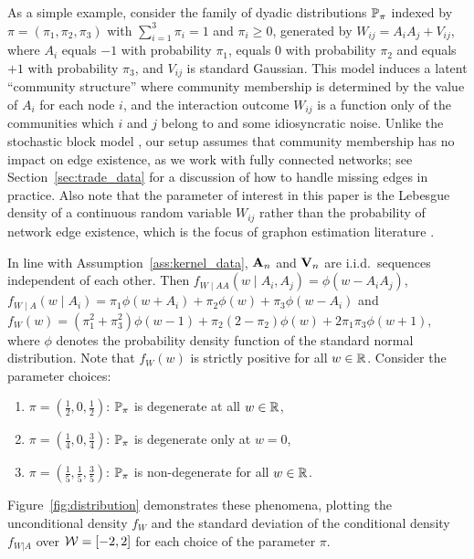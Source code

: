 As a simple example,
consider the family of dyadic distributions $\P_{\pi}$
indexed by $\pi = (\pi_1, \pi_2, \pi_3)$
with $\sum_{i=1}^3 \pi_i = 1$ and $\pi_i \geq 0$,
generated by $W_{i j} = A_i A_j + V_{i j}$,
where $A_i$ equals $-1$ with probability $\pi_1$,
equals $0$ with probability $\pi_2$
and equals $+1$ with probability $\pi_3$,
and $V_{i j}$ is standard Gaussian.
This model induces a latent
``community structure'' where community membership
is determined by the value of $A_i$ for each node $i$,
and the interaction outcome $W_{i j}$ is a function
only of the communities which $i$ and $j$ belong to and some
idiosyncratic noise.
Unlike the stochastic block model
\citep{kolaczyk2009statistical},
our setup assumes that
community membership has no impact on edge existence,
as we work with fully connected networks;
see Section~\ref{sec:trade_data} for a discussion of
how to handle missing edges in practice.
Also note that the parameter of interest in this paper is the Lebesgue density
of a continuous random variable $W_{i j}$
rather than the probability of network edge existence,
which is the focus of graphon estimation
literature \citep{gao2021minimax}.

In line with Assumption~\ref{ass:kernel_data}, $\bA_n$ and $\bV_n$ are i.i.d.\
sequences independent of each other.
Then
$f_{W \mid AA}(w \mid A_i, A_j) = \phi(w - A_i A_j)$,\,
$f_{W \mid A}(w \mid A_i) = \pi_1 \phi(w + A_i) + \pi_2 \phi(w)
+ \pi_3 \phi(w - A_i)$
and
$f_W(w) = (\pi_1^2 + \pi_3^2) \phi(w-1) + \pi_2 (2 - \pi_2) \phi(w) + 2
\pi_1 \pi_3 \phi(w+1),$
where $\phi$ denotes the probability density function of
the standard normal distribution.
Note that $f_W(w)$ is strictly positive for all $w \in \R$.
Consider the parameter choices:
%
\begin{enumerate}[label=(\roman*)]\onehalfspacing

  \item $\pi = \left( \frac{1}{2}, 0, \frac{1}{2} \right)$:\quad
    $\P_\pi$ is degenerate at all $w \in \R$,

  \item $\pi = \left( \frac{1}{4}, 0, \frac{3}{4} \right)$:\quad
    $\P_\pi$ is degenerate only at $w=0$,

  \item $\pi = \left( \frac{1}{5}, \frac{1}{5}, \frac{3}{5} \right)$:\quad
    $\P_\pi$ is non-degenerate for all $w \in \R$.

\end{enumerate}
%
Figure~\ref{fig:distribution} demonstrates these phenomena,
plotting the unconditional density $f_W$
and the standard deviation of the conditional density $f_{W|A}$
over $\cW = [-2,2]$ for each choice of the parameter $\pi$.

